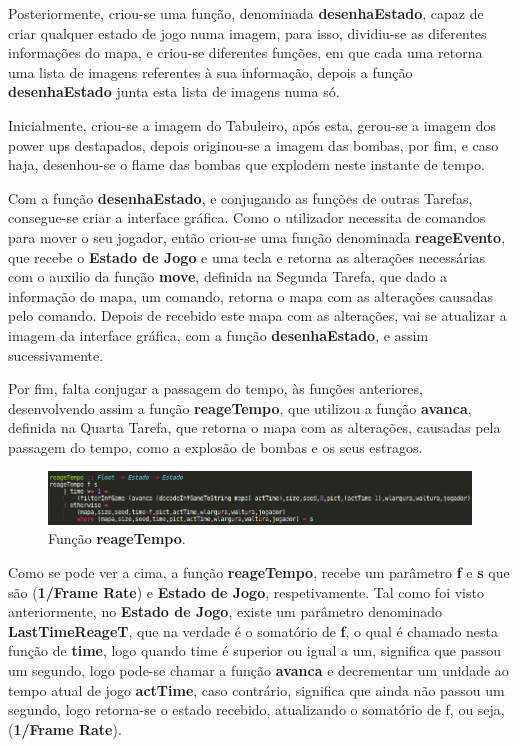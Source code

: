 \documentclass[4apaper]{report}
\begin{document}
Posteriormente, criou-se uma função, denominada \textbf{desenhaEstado}, capaz de criar qualquer estado de jogo numa imagem, para isso, dividiu-se as diferentes informações do mapa, e criou-se diferentes funções, em que cada uma retorna uma lista de imagens referentes à sua informação, depois a função \textbf{desenhaEstado} junta esta lista de imagens numa só. 

Inicialmente, criou-se a imagem do Tabuleiro, após esta, gerou-se a imagem dos power ups destapados, depois originou-se a imagem das bombas, por fim, e caso haja, desenhou-se o flame das bombas que explodem neste instante de tempo.

Com a função \textbf{desenhaEstado}, e conjugando as funções de outras Tarefas, consegue-se criar a interface gráfica. Como o utilizador necessita de comandos para mover o seu jogador, então criou-se uma função denominada \textbf{reageEvento}, que recebe o \textbf{Estado de Jogo} e uma tecla e retorna as alterações necessárias com o auxilio da função \textbf{move}, definida na Segunda Tarefa, que dado a informação do mapa, um comando, retorna o mapa com as alterações causadas pelo comando. Depois de recebido este mapa com as alterações, vai se atualizar a imagem da interface gráfica, com a função \textbf{desenhaEstado}, e assim sucessivamente.

Por fim, falta conjugar a passagem do tempo, às funções anteriores, desenvolvendo assim a função \textbf{reageTempo}, que utilizou a função \textbf{avanca}, definida na Quarta Tarefa, que retorna o mapa com as alterações, causadas pela passagem do tempo, como a explosão de bombas e os seus estragos. 

\begin{figure}[ht]
	\centering
	\includegraphics[scale=0.70]{algo_T5.jpg}
	\caption{Função \textbf{reageTempo}.}
	\label{img:algoT5}
\end{figure}

Como se pode ver a cima, a função \textbf{reageTempo}, recebe um parâmetro \textbf{f} e \textbf{s} que são (\textbf{1/Frame Rate}) e \textbf{Estado de Jogo}, respetivamente. Tal como foi visto anteriormente, no \textbf{Estado de Jogo}, existe um parâmetro denominado \textbf{LastTimeReageT}, que na verdade é o somatório de \textbf{f}, o qual é chamado nesta função de \textbf{time}, logo quando time é superior ou igual a um, significa que passou um segundo, logo pode-se chamar a função \textbf{avanca} e decrementar um unidade ao tempo atual de jogo \textbf{actTime}, caso contrário, significa que ainda não passou um segundo, logo retorna-se o estado recebido, atualizando o somatório de f, ou seja, (\textbf{1/Frame Rate}).
\end{document}
